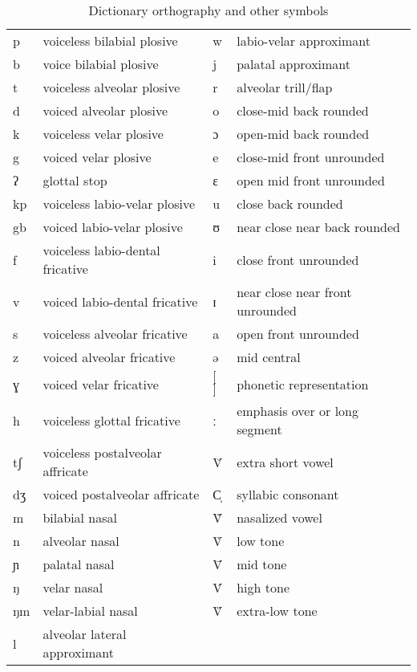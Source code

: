 \begin{table}
  \caption{Dictionary orthography and other symbols\label{tab:orth-symb}}
\small
 \begin{tabular}{llll}
p & voiceless bilabial plosive & w&labio-velar approximant\\
b & voice bilabial plosive &j & palatal approximant \\
t & voiceless alveolar plosive &r & alveolar trill/flap\\
d &  voiced alveolar plosive&o& close-mid back rounded\\
k & voiceless velar plosive  &ɔ& open-mid back rounded\\
g & voiced velar plosive &e& close-mid front unrounded\\
ʔ & glottal stop &ɛ& open mid front unrounded\\
kp & voiceless labio-velar plosive &u& close back rounded\\
gb & voiced labio-velar plosive&ʊ& near close near back rounded\\
f & voiceless labio-dental fricative &i& close front unrounded\\
v & voiced labio-dental fricative  &ɪ& near close near front unrounded\\
s & voiceless alveolar fricative &a& open front unrounded\\
z & voiced alveolar fricative &ə& mid central\\
ɣ & voiced velar fricative&$[$ $]$ & phonetic representation\\
h & voiceless glottal fricative & ː & emphasis over or long segment\\
tʃ & voiceless postalveolar affricate & V̆ & extra short vowel\\
dʒ & voiced postalveolar affricate&C̩& syllabic consonant\\
m & bilabial nasal &  Ṽ & nasalized   vowel\\
n & alveolar nasal& V̀ & low tone \\
ɲ & palatal nasal &  V̄ & mid tone \\
ŋ & velar nasal& V́ & high tone \\
ŋm & velar-labial nasal&V̏  & extra-low tone \\
l & alveolar lateral approximant  & &\\
\end{tabular}

 \end{table}
 

